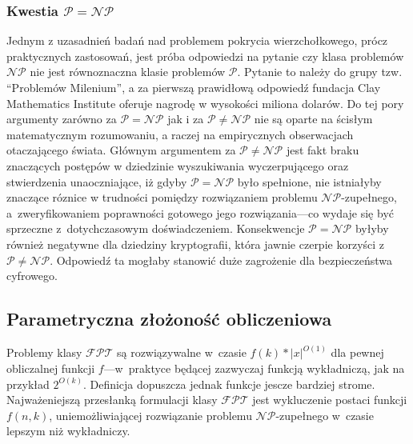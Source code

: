\subsubsection{\textbf{Kwestia $\mathcal{P}=\mathcal{NP}$}}
\label{sss_problem_p_neq_np}
\par{
  Jednym z uzasadnień badań nad problemem pokrycia wierzchołkowego, prócz
  praktycznych zastosowań, jest próba odpowiedzi na pytanie czy klasa problemów
  $\mathcal{NP}$ nie jest równoznaczna klasie problemów $\mathcal{P}$.
  Pytanie to należy do grupy tzw. ``Problemów Milenium'', a za pierwszą
  prawidłową odpowiedź fundacja Clay Mathematics Institute oferuje nagrodę w
  wysokości miliona dolarów. 
  Do tej pory argumenty zarówno za $\mathcal{P}=\mathcal{NP}$ jak i za
  $\mathcal{P}\neq\mathcal{NP}$ nie są oparte na ścisłym matematycznym
  rozumowaniu, a raczej na empirycznych obserwacjach otaczającego świata.
  Głównym argumentem za $\mathcal{P}\neq\mathcal{NP}$ jest fakt braku znaczących
  postępów w dziedzinie wyszukiwania wyczerpującego oraz stwierdzenia
  unaoczniające, iż gdyby $\mathcal{P}=\mathcal{NP}$ było spełnione, nie 
  istniałyby znaczące róznice w trudności pomiędzy rozwiązaniem 
  problemu $\mathcal{NP}$-zupełnego, a~zweryfikowaniem poprawności gotowego 
  jego rozwiązania---co wydaje się być sprzeczne z~dotychczasowym doświadczeniem.
  Konsekwencje $\mathcal{P}=\mathcal{NP}$ byłyby również negatywne dla dziedziny
  kryptografii, która jawnie czerpie korzyści z $\mathcal{P}\neq\mathcal{NP}$.
  Odpowiedź ta mogłaby stanowić duże zagrożenie dla bezpieczeństwa cyfrowego.
}

\subsection{Parametryczna złożoność obliczeniowa}
\label{sss_parametric_complexity}
\par{
  Problemy klasy $\mathcal{FPT}$ są rozwiązywalne w~czasie $f(k)*|x|^{O(1)}$ dla
  pewnej obliczalnej funkcji $f$---w~praktyce będącej zazwyczaj funkcją 
  wykładniczą, jak na przykład $2^{O(k)}$.
  Definicja dopuszcza jednak funkcje jescze bardziej strome.
  Najważeniejszą przesłanką formulacji klasy $\mathcal{FPT}$ jest wykluczenie
  postaci funkcji $f(n,k)$, uniemożliwiającej rozwiązanie problemu 
  $\mathcal{NP}$-zupełnego w~czasie lepszym niż wykładniczy.
}

